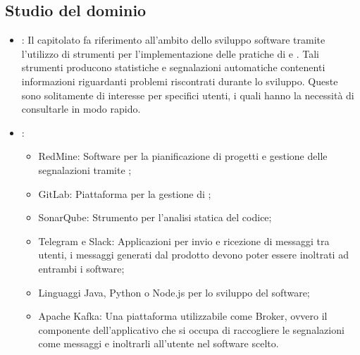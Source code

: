 \subsection{Studio del dominio}
     \begin{itemize}
        \item \textbf{}: Il capitolato fa riferimento all'ambito dello sviluppo software tramite l'utilizzo di strumenti per l'implementazione delle pratiche di  e . Tali strumenti producono statistiche e segnalazioni automatiche contenenti informazioni riguardanti problemi riscontrati durante lo sviluppo. Queste sono solitamente di interesse per specifici utenti, i quali hanno la necessità di consultarle in modo rapido.
        \item \textbf{}:
        \begin{itemize}
        \item RedMine: Software per la pianificazione di progetti e gestione delle segnalazioni tramite ;
        \item GitLab: Piattaforma per la gestione di  ;
        \item SonarQube: Strumento per l'analisi statica del codice;
        \item Telegram e Slack: Applicazioni per invio e ricezione di messaggi tra utenti, i messaggi generati dal prodotto devono poter essere inoltrati ad entrambi i software;
        \item Linguaggi Java, Python o Node.js per lo sviluppo del software;
        \item Apache Kafka: Una piattaforma  utilizzabile come Broker, ovvero il componente dell'applicativo che si occupa di raccogliere le segnalazioni come messaggi e inoltrarli all'utente nel software scelto.
        \end{itemize}
    \end{itemize}
